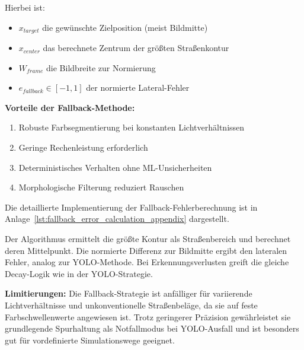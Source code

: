 Hierbei ist:
\begin{itemize}
    \item $x_{target}$ die gewünschte Zielposition (meist Bildmitte)
    \item $x_{center}$ das berechnete Zentrum der größten Straßenkontur
    \item $W_{frame}$ die Bildbreite zur Normierung
    \item $e_{fallback} \in [-1, 1]$ der normierte Lateral-Fehler
\end{itemize}


\textbf{Vorteile der Fallback-Methode:}
\begin{enumerate}
    \item Robuste Farbsegmentierung bei konstanten Lichtverhältnissen
    \item Geringe Rechenleistung erforderlich
    \item Deterministisches Verhalten ohne ML-Unsicherheiten
    \item Morphologische Filterung reduziert Rauschen
\end{enumerate}

Die detaillierte Implementierung der Fallback-Fehlerberechnung ist in Anlage~\ref{lst:fallback_error_calculation_appendix} dargestellt.



Der Algorithmus ermittelt die größte Kontur als Straßenbereich und berechnet deren Mittelpunkt. Die normierte 
Differenz zur Bildmitte ergibt den lateralen Fehler, analog zur YOLO-Methode. Bei Erkennungsverlusten greift 
die gleiche Decay-Logik wie in der YOLO-Strategie.

\textbf{Limitierungen:} Die Fallback-Strategie ist anfälliger für variierende Lichtverhältnisse und 
unkonventionelle Straßenbeläge, da sie auf feste Farbschwellenwerte angewiesen ist.
Trotz geringerer Präzision gewährleistet sie grundlegende Spurhaltung 
als Notfallmodus bei YOLO-Ausfall und ist besonders gut für vordefinierte Simulationswege geeignet.



